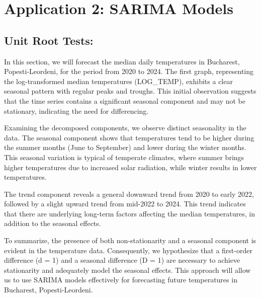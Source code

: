 \documentclass{article} %
\begin{document}
\section{Application 2: SARIMA Models }
\subsection{Unit Root Tests:}

In this section, we will forecast the median daily temperatures in Bucharest, Popesti-Leordeni, for the period from 2020 to 2024. The first graph, representing the log-transformed median temperatures (LOG\_TEMP), exhibits a clear seasonal pattern with regular peaks and troughs. This initial observation suggests that the time series contains a significant seasonal component and may not be stationary, indicating the need for differencing.

Examining the decomposed components, we observe distinct seasonality in the data. The seasonal component shows that temperatures tend to be higher during the summer months (June to September) and lower during the winter months. This seasonal variation is typical of temperate climates, where summer brings higher temperatures due to increased solar radiation, while winter results in lower temperatures.

The trend component reveals a general downward trend from 2020 to early 2022, followed by a slight upward trend from mid-2022 to 2024. This trend indicates that there are underlying long-term factors affecting the median temperatures, in addition to the seasonal effects.

To summarize, the presence of both non-stationarity and a seasonal component is evident in the temperature data. Consequently, we hypothesize that a first-order difference (d = 1) and a seasonal difference (D = 1) are necessary to achieve stationarity and adequately model the seasonal effects. This approach will allow us to use SARIMA models effectively for forecasting future temperatures in Bucharest, Popesti-Leordeni.
\end{document}
